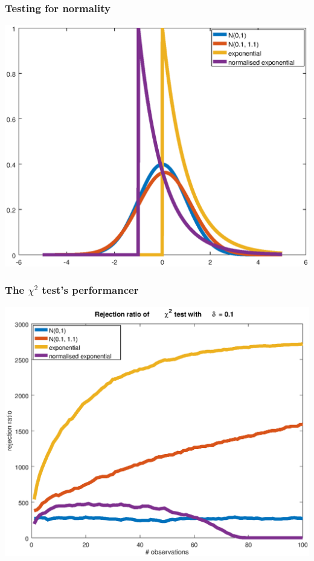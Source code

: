\begin{frame}\frametitle{Testing for normality}
  \includegraphics[width=\textwidth]{../figures/distribution_examples}
\end{frame}

\begin{frame}\frametitle{The $\chi^2$ test's performancer}
  \includegraphics[width=\textwidth]{../figures/rejection_ratio}
\end{frame}







